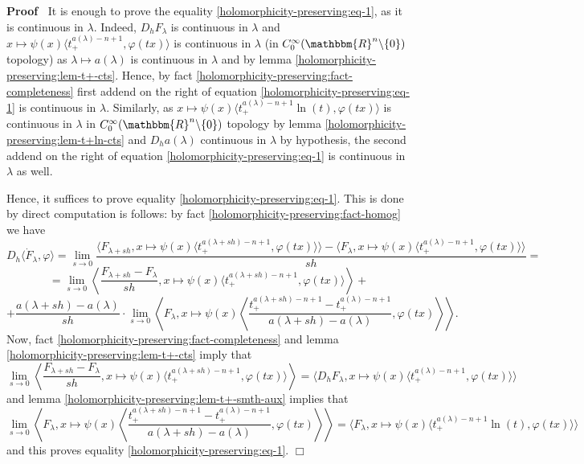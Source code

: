 \documentclass{article}
\newenvironment{proof}{\noindent\textbf{Proof\ }}{\hspace*{\fill}$\Box$\medskip}
\numberwithin{definition}{section}
\numberwithin{lemma}{section}
\numberwithin{proposition}{section}
{\theorembodyfont{\rmfamily}\newtheorem{remark}{Remark}
\numberwithin{remark}{section}
}
\begin{document}
\begin{proof}
  It is enough to prove the equality \ref{holomorphicity-preserving:eq-1}, as
  it is continuous in $\lambda$. Indeed, $D_h F_{\lambda}$ is continuous in
  $\lambda$ and $x \mapsto \psi ( x) \langle t^{a ( \lambda) - n + 1}_+,
  \varphi ( t x) \rangle$ is continuous in $\lambda$ (in $C_0^{\infty} (
  \mathbbm{R}^n \backslash \{ 0 \})$ topology) as $\lambda \mapsto a (
  \lambda)$ is continuous in $\lambda$ and by lemma
  \ref{holomorphicity-preserving:lem-t+-cts}. Hence, by fact
  \ref{holomorphicity-preserving:fact-completeness} first addend on the right
  of equation \ref{holomorphicity-preserving:eq-1} is continuous in $\lambda$.
  Similarly, as $x \mapsto \psi ( x) \langle t_+^{a ( \lambda) - n + 1} \ln (
  t), \varphi ( t x) \rangle$ is continuous in $\lambda$ in $C_0^{\infty} (
  \mathbbm{R}^n \backslash \{ 0 \})$ topology by lemma
  \ref{holomorphicity-preserving:lem-t+ln-cts} and $D_h a ( \lambda)$
  continuous in $\lambda$ by hypothesis, the second addend on the right of
  equation \ref{holomorphicity-preserving:eq-1} is continuous in $\lambda$ as
  well.
  
  Hence, it suffices to prove equality \ref{holomorphicity-preserving:eq-1}.
  This is done by direct computation is follows: by fact
  \ref{holomorphicity-preserving:fact-homog} we have
  \[ D_h \langle \dot{F}_{\lambda}, \varphi \rangle = \lim_{s \rightarrow 0}
     \frac{\langle F_{\lambda + s h}, x \mapsto \psi ( x) \langle t^{a (
     \lambda + s h) - n + 1}_+, \varphi ( t x) \rangle \rangle - \langle
     F_{\lambda}, x \mapsto \psi ( x) \langle t^{a ( \lambda) - n + 1}_+,
     \varphi ( t x) \rangle \rangle}{s h} = \]
  \[ = \lim_{s \rightarrow 0} \left\langle \frac{F_{\lambda + s h} -
     F_{\lambda}}{s h}, x \mapsto \psi ( x) \langle t^{a ( \lambda + s h) - n
     + 1}_+, \varphi ( t x) \rangle \right\rangle + \]
  \[ + \frac{a ( \lambda + s h) - a ( \lambda)}{s h} \cdot \lim_{s \rightarrow
     0} \left\langle F_{\lambda}, x \mapsto \psi ( x) \left\langle \frac{t^{a
     ( \lambda + s h) - n + 1}_+ - t^{a ( \lambda) - n + 1}_+}{a ( \lambda + s
     h) - a ( \lambda)}, \varphi ( t x) \right\rangle \right\rangle . \]
  Now, fact \ref{holomorphicity-preserving:fact-completeness} and lemma
  \ref{holomorphicity-preserving:lem-t+-cts} imply that
  \[ \lim_{s \rightarrow 0} \left\langle \frac{F_{\lambda + s h} -
     F_{\lambda}}{s h}, x \mapsto \psi ( x) \langle t^{a ( \lambda + s h) - n
     + 1}_+, \varphi ( t x) \rangle \right\rangle = \langle D_h F_{\lambda}, x
     \mapsto \psi ( x) \langle t^{a ( \lambda) - n + 1}_+, \varphi ( t x)
     \rangle \rangle \]
  and lemma \ref{holomorphicity-preserving:lem-t+-smth-aux} implies that
  \[ \lim_{s \rightarrow 0} \left\langle F_{\lambda}, x \mapsto \psi ( x)
     \left\langle \frac{t^{a ( \lambda + s h) - n + 1}_+ - t^{a ( \lambda) - n
     + 1}_+}{a ( \lambda + s h) - a ( \lambda)}, \varphi ( t x) \right\rangle
     \right\rangle = \langle F_{\lambda}, x \mapsto \psi ( x) \langle t_+^{a (
     \lambda) - n + 1} \ln ( t), \varphi ( t x) \rangle \rangle \]
  and this proves equality \ref{holomorphicity-preserving:eq-1}.
\end{proof}
\end{document}
